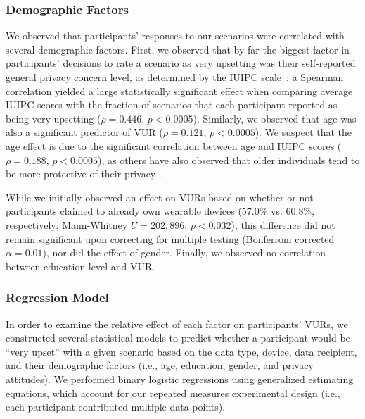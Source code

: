 \documentclass{acm_proc_article-sp}
\begin{document}

\subsubsection{Demographic Factors}

We observed that participants' responses to our scenarios were correlated with several demographic factors. First, we observed that by far the biggest factor in participants' decisions to rate a scenario as very upsetting was their self-reported general privacy concern level, as determined by the IUIPC scale~\cite{malhotra2004internet}: a Spearman correlation yielded a large statistically significant effect when comparing average IUIPC scores with the fraction of scenarios that each participant reported as being very upsetting ($\rho=0.446$, $p<0.0005$). Similarly, we observed that age was also a significant predictor of VUR ($\rho=0.121$, $p<0.0005$). We suspect that the age effect is due to the significant correlation between age and IUIPC scores ($\rho=0.188$, $p<0.0005$), as others have also observed that older individuals tend to be more protective of their privacy~\cite{varian2005demographics}.

While we initially observed an effect on VURs based on whether or not participants claimed to already own wearable devices (57.0\% vs. 60.8\%, respectively; Mann-Whitney $U=202,896$, $p<0.032$), this difference did not remain significant upon correcting for multiple testing (Bonferroni corrected $\alpha=0.01$), nor did the effect of gender. Finally, we observed no correlation between education level and VUR.

\subsubsection{Regression Model} 
In order to examine the relative effect of each factor on participants' VURs, we constructed several statistical models to predict whether a participant would be ``very upset'' with a given scenario based on the data type, device, data recipient, and their demographic factors (i.e., age, education, gender, and privacy attitudes). We performed binary logistic regressions using generalized estimating equations, which account for our repeated measures experimental design (i.e., each participant contributed multiple data points).
\end{document}
